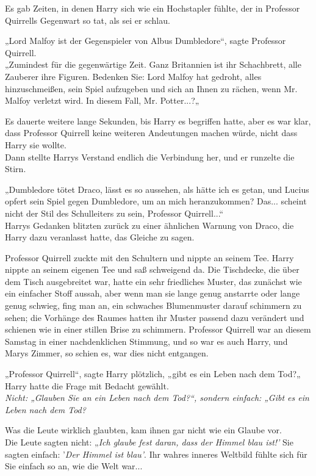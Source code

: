 {Es gab Zeiten, in denen Harry sich wie ein Hochstapler fühlte, der in Professor Quirrells Gegenwart so tat, als sei er schlau.

„Lord Malfoy ist der Gegenspieler von Albus Dumbledore“, sagte Professor Quirrell.\\ „Zumindest für die gegenwärtige Zeit. Ganz Britannien ist ihr Schachbrett, alle Zauberer ihre Figuren. Bedenken Sie: Lord Malfoy hat gedroht, alles hinzuschmeißen, sein Spiel aufzugeben und sich an Ihnen zu rächen, wenn Mr. Malfoy verletzt wird. In diesem Fall, Mr. Potter...?„

Es dauerte weitere lange Sekunden, bis Harry es begriffen hatte, aber es war klar, dass Professor Quirrell keine weiteren Andeutungen machen würde, nicht dass Harry sie wollte.\\ Dann stellte Harrys Verstand endlich die Verbindung her, und er runzelte die Stirn.

„Dumbledore tötet Draco, lässt es so aussehen, als hätte ich es getan, und Lucius opfert sein Spiel gegen Dumbledore, um an mich heranzukommen? Das... scheint nicht der Stil des Schulleiters zu sein, Professor Quirrell...“\\ Harrys Gedanken blitzten zurück zu einer ähnlichen Warnung von Draco, die Harry dazu veranlasst hatte, das Gleiche zu sagen.

Professor Quirrell zuckte mit den Schultern und nippte an seinem Tee. Harry nippte an seinem eigenen Tee und saß schweigend da. Die Tischdecke, die über dem Tisch ausgebreitet war, hatte ein sehr friedliches Muster, das zunächst wie ein einfacher Stoff aussah, aber wenn man sie lange genug anstarrte oder lange genug schwieg, fing man an, ein schwaches Blumenmuster darauf schimmern zu sehen; die Vorhänge des Raumes hatten ihr Muster passend dazu verändert und schienen wie in einer stillen Brise zu schimmern. Professor Quirrell war an diesem Samstag in einer nachdenklichen Stimmung, und so war es auch Harry, und Marys Zimmer, so schien es, war dies nicht entgangen.

„Professor Quirrell“, sagte Harry plötzlich, „gibt es ein Leben nach dem Tod?„\\ Harry hatte die Frage mit Bedacht gewählt.\\ \emph{Nicht: „Glauben Sie an ein Leben nach dem Tod?“, sondern einfach: „Gibt es ein Leben nach dem Tod?}

Was die Leute wirklich glaubten, kam ihnen gar nicht wie ein Glaube vor.\\ Die Leute sagten nicht: „\emph{Ich glaube fest daran, dass der Himmel blau ist!'} Sie sagten einfach: '\emph{Der Himmel ist blau'}. Ihr wahres inneres Weltbild fühlte sich für Sie einfach so an, wie die Welt war...

}
